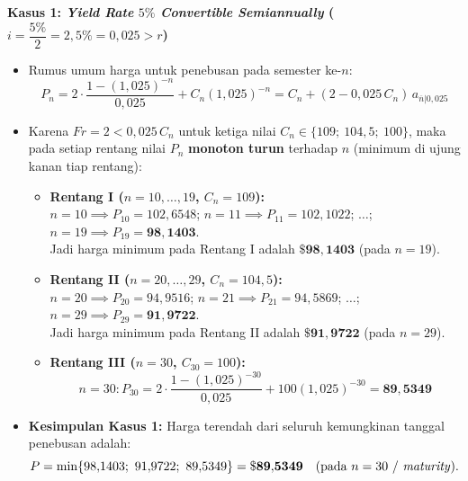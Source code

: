 \documentclass[11pt,a4paper]{article}
\begin{document}
\begin{examplebox}
\medskip
\noindent\textbf{Kasus 1: \textit{Yield Rate} $5\%$ \textit{Convertible Semiannually} ($i = \dfrac{5\%}{2} = 2{,}5\% = 0{,}025 > r$)}
\begin{itemize}[topsep=2pt, itemsep=2pt]
    \item Rumus umum harga untuk penebusan pada semester ke-$n$:
    \[
        P_n = 2 \cdot \frac{1 - (1{,}025)^{-n}}{0{,}025} + C_n(1{,}025)^{-n} = C_n + (2 - 0{,}025\,C_n)\,a_{\overline{n}|0{,}025}
    \]
    \item Karena $Fr = 2 < 0{,}025\,C_n$ untuk ketiga nilai $C_n \in \{109;\ 104{,}5;\ 100\}$, maka pada setiap rentang nilai $P_n$ \textbf{monoton turun} terhadap $n$ (minimum di ujung kanan tiap rentang):
    \begin{itemize}
        \item \textbf{Rentang I ($n = 10, \dots, 19$, $C_n = 109$):}\\
        $n = 10 \implies P_{10} = 102{,}6548$; \quad $n = 11 \implies P_{11} = 102{,}1022$; \quad $\dots$; \quad $n = 19 \implies P_{19} = \mathbf{98{,}1403}$.\\
        Jadi harga minimum pada Rentang I adalah $\mathbf{\$98{,}1403}$ (pada $n = 19$).
        \item \textbf{Rentang II ($n = 20, \dots, 29$, $C_n = 104{,}5$):}\\
        $n = 20 \implies P_{20} = 94{,}9516$; \quad $n = 21 \implies P_{21} = 94{,}5869$; \quad $\dots$; \quad $n = 29 \implies P_{29} = \mathbf{91{,}9722}$.\\
        Jadi harga minimum pada Rentang II adalah $\mathbf{\$91{,}9722}$ (pada $n = 29$).
        \item \textbf{Rentang III ($n = 30$, $C_{30} = 100$):}
        \[
            n = 30: P_{30} = 2 \cdot \frac{1 - (1{,}025)^{-30}}{0{,}025} + 100(1{,}025)^{-30} = \mathbf{89{,}5349}
        \]
    \end{itemize}
    \item \textbf{Kesimpulan Kasus 1:} Harga terendah dari seluruh kemungkinan tanggal penebusan adalah:
    \[
        P = \min\{98{,}1403;\ 91{,}9722;\ 89{,}5349\} = \mathbf{\$89{,}5349} \quad (\text{pada } n = 30 \text{ / \textit{maturity}}).
    \]
\end{itemize}


\end{examplebox}
\end{document}
